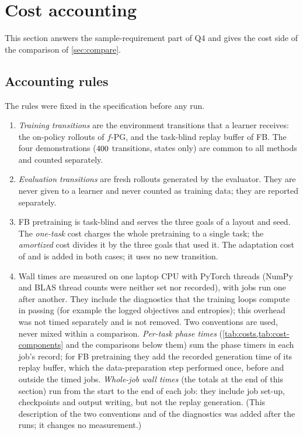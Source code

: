 \section{Cost accounting}\label{sec:costs}

This section answers the sample-requirement part of Q4 and gives the cost side of the comparison of \cref{sec:compare}.

\subsection{Accounting rules}

The rules were fixed in the specification before any run.
\begin{enumerate}[nosep,label=(\roman*)]
\item \emph{Training transitions} are the environment transitions that a learner receives: the on-policy rollouts of $f$-PG, and the task-blind replay buffer of FB. The four demonstrations ($\vn{s14.demo_transitions}{400}$ transitions, states only) are common to all methods and counted separately.
\item \emph{Evaluation transitions} are fresh rollouts generated by the evaluator. They are never given to a learner and never counted as training data; they are reported separately.
\item FB pretraining is task-blind and serves the three goals of a layout and seed. The \emph{one-task} cost charges the whole pretraining to a single task; the \emph{amortized} cost divides it by the three goals that used it. The adaptation cost of \ERFB{} and \DMFB{} is added in both cases; it uses no new transition.
\item Wall times are measured on one laptop CPU with  PyTorch threads (NumPy and BLAS thread counts were neither set nor recorded), with jobs run one after another. They include the diagnostics that the training loops compute in passing (for example the logged objectives and entropies); this overhead was not timed separately and is not removed. Two conventions are used, never mixed within a comparison. \emph{Per-task phase times} (\cref{tab:costs,tab:cost-components} and the comparisons below them) sum the phase timers in each job's record; for FB pretraining they add the recorded generation time of its replay buffer, which the data-preparation step performed once, before and outside the timed jobs. \emph{Whole-job wall times} (the totals at the end of this section) run from the start to the end of each job: they include job set-up, checkpoints and output writing, but not the replay generation. (This description of the two conventions and of the diagnostics was added after the runs; it changes no measurement.)
\end{enumerate}

